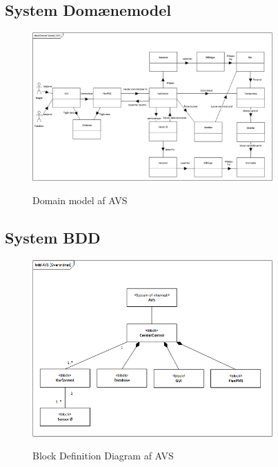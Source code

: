 
\subsection{System Domænemodel}

\begin{figure}[H]
	\centering
	\includegraphics[width=0.82\textwidth]{Systemarkitektur/System/AVS_domain_model.png}
	\label{fig:System BDD}
	\caption{Domain model af AVS}
\end{figure}



\subsection{System BDD}

\begin{figure}[H]
	\centering
	\includegraphics[width=0.82\textwidth]{Systemarkitektur/System/AVS_SystemdiagramBDD.png}
	\label{fig:System BDD}
	\caption{Block Definition Diagram af AVS}
\end{figure}




